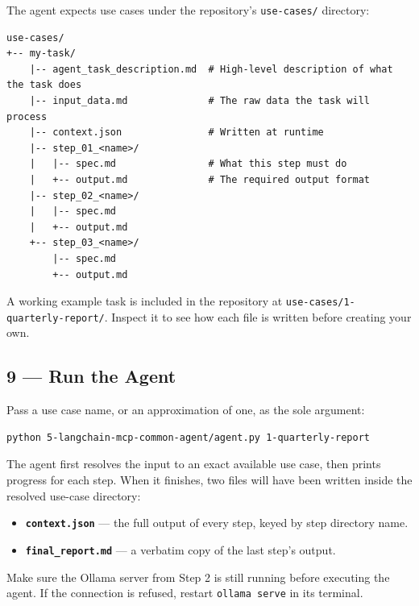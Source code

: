 \documentclass[12pt, a4paper]{article}
\begin{document}
The agent expects use cases under the repository's \texttt{use-cases/} directory:

\begin{lstlisting}[language={}]
use-cases/
+-- my-task/
    |-- agent_task_description.md  # High-level description of what the task does
    |-- input_data.md              # The raw data the task will process
    |-- context.json               # Written at runtime
    |-- step_01_<name>/
    |   |-- spec.md                # What this step must do
    |   +-- output.md              # The required output format
    |-- step_02_<name>/
    |   |-- spec.md
    |   +-- output.md
    +-- step_03_<name>/
        |-- spec.md
        +-- output.md
\end{lstlisting}

\begin{notebox}
A working example task is included in the repository at \texttt{use-cases/1-quarterly-report/}. Inspect it to see how each file is written before creating your own.
\end{notebox}

\subsection{9 --- Run the Agent}

Pass a use case name, or an approximation of one, as the sole argument:

\begin{lstlisting}[style=shellstyle]
python 5-langchain-mcp-common-agent/agent.py 1-quarterly-report
\end{lstlisting}

The agent first resolves the input to an exact available use case, then prints progress for each step. When it finishes, two files will have been written inside the resolved use-case directory:

\begin{itemize}[leftmargin=1.5em]
  \item \textbf{\texttt{context.json}} --- the full output of every step, keyed by step directory name.
  \item \textbf{\texttt{final\_report.md}} --- a verbatim copy of the last step's output.
\end{itemize}

\begin{warnbox}
Make sure the Ollama server from Step 2 is still running before executing the agent. If the connection is refused, restart \texttt{ollama serve} in its terminal.
\end{warnbox}
\end{document}
